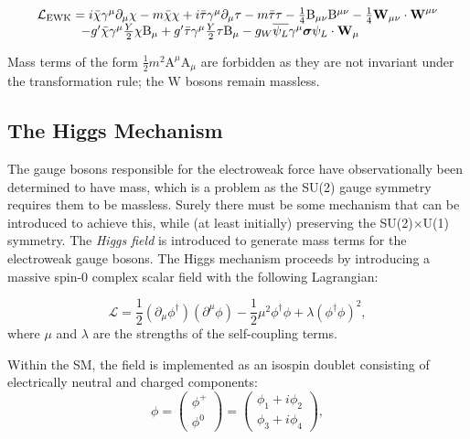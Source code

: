 \begin{equation}
\begin{array}{l}
\mathcal{L}_{\mathrm{EWK}} = 
i \bar{\chi} \gamma^{\mu} \partial_{\mu} \chi - m \bar{\chi} \chi
+ i \bar{\tau}   \gamma^{\mu}    \partial_{\mu} \tau  - m \bar{\tau} \tau
- \frac{1}{4}\mathrm{B}_{\mu\nu}\mathrm{B}^{\mu\nu}
-\frac{1}{4}\bm{\mathrm{W}}_{\mu\nu} \cdot \bm{\mathrm{W}}^{\mu\nu} \\
\hspace{1.2cm}
-  g' \bar{\chi} \gamma^{\mu} \frac{Y}{2} \chi \mathrm{B}_{\mu} + g' \bar{\tau} \gamma^{\mu} \frac{Y}{2} \tau \mathrm{B}_{\mu}
- g_W  \overline{\psi_{L}} \gamma^{\mu} \bm{\sigma} \psi_{L} \cdot \bm{\mathrm{W}}_{\mu}
\end{array}
\end{equation}

Mass terms of the form $\frac{1}{2}m^{2}\mathrm{A}^{\mu}\mathrm{A}_{\mu}$ are forbidden as they are not invariant under the transformation rule; the $\bm{\mathrm{W}}$ bosons remain massless.

\subsection{The Higgs Mechanism}

The gauge bosons responsible for the electroweak force have observationally been determined to have mass, which is a problem as the SU(2) gauge symmetry requires them to be massless. Surely there must be some mechanism that can be introduced to achieve this, while (at least initially) preserving the SU(2)$\times$U(1) symmetry. The \textit{Higgs field} is introduced to generate mass terms for the electroweak gauge bosons. The Higgs mechanism proceeds by introducing a massive spin-0 complex scalar field with the following Lagrangian:

\begin{equation}
\label{higgslag}
\mathcal{L} = \frac{1}{2} (\partial_{\mu}\phi^{\dagger})(\partial^{\mu}\phi) - \frac{1}{2}\mu^{2} \phi^{\dagger}\phi + \lambda(\phi^{\dagger}\phi)^{2},
\end{equation}
where $\mu$ and $\lambda$ are the strengths of the self-coupling terms.

Within the SM, the field is implemented as an isospin doublet consisting of electrically neutral and charged components:
\begin{equation}
\phi = \begin{pmatrix} \phi^{+} \\ \phi^{0} \end{pmatrix} = \begin{pmatrix} \phi_{1} + i\phi_{2} \\  \phi_{3} + i\phi_{4} \end{pmatrix},
\end{equation}


